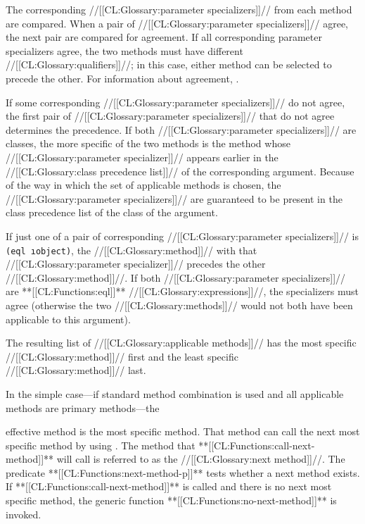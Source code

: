 The corresponding //[[CL:Glossary:parameter specializers]]// from each method are compared.  When a pair of //[[CL:Glossary:parameter specializers]]// agree, the next pair are compared for agreement.  If all corresponding parameter specializers agree, the two methods must have different //[[CL:Glossary:qualifiers]]//; in this case, either method can be selected to precede the other.  For information about agreement, \seesection\SpecializerQualifierAgreement.

If some corresponding //[[CL:Glossary:parameter specializers]]// do not agree, the first pair of //[[CL:Glossary:parameter specializers]]// that do not agree determines the precedence.  If both //[[CL:Glossary:parameter specializers]]// are classes, the more specific of the two methods is the method whose //[[CL:Glossary:parameter specializer]]// appears earlier in the //[[CL:Glossary:class precedence list]]// of the corresponding argument.  Because of the way in which the set of applicable methods is chosen, the //[[CL:Glossary:parameter specializers]]// are guaranteed to be present in the class precedence list of the class of the argument.

If just one of a pair of corresponding //[[CL:Glossary:parameter specializers]]// is {\tt (eql \i{object})}, the //[[CL:Glossary:method]]// with that //[[CL:Glossary:parameter specializer]]// precedes the other //[[CL:Glossary:method]]//.  If both //[[CL:Glossary:parameter specializers]]// are **[[CL:Functions:eql]]** //[[CL:Glossary:expressions]]//, the specializers must agree (otherwise the two //[[CL:Glossary:methods]]// would not both have been applicable to this argument).

The resulting list of //[[CL:Glossary:applicable methods]]// has the most specific //[[CL:Glossary:method]]// first and the least specific //[[CL:Glossary:method]]// last.    

\endsubsubsubsection%

 

In the simple case---if standard method combination is used and all applicable methods are primary methods---the 

effective method is the most specific method. That method can call the next most specific method by using .  The method that **[[CL:Functions:call-next-method]]** will call is referred to as the  //[[CL:Glossary:next method]]//.  The predicate **[[CL:Functions:next-method-p]]** tests whether a next method exists.  If **[[CL:Functions:call-next-method]]** is called and there is no next most specific method, the generic function **[[CL:Functions:no-next-method]]** is invoked.

